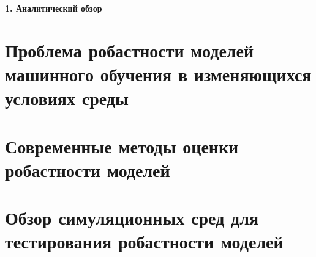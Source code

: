 \newpage
\begin{center}
  \textbf{\large 1. Аналитический обзор }
\end{center}

\section{Проблема робастности моделей машинного обучения в изменяющихся условиях среды}
\section{Современные методы оценки робастности моделей}
\section{Обзор симуляционных сред для тестирования робастности моделей}